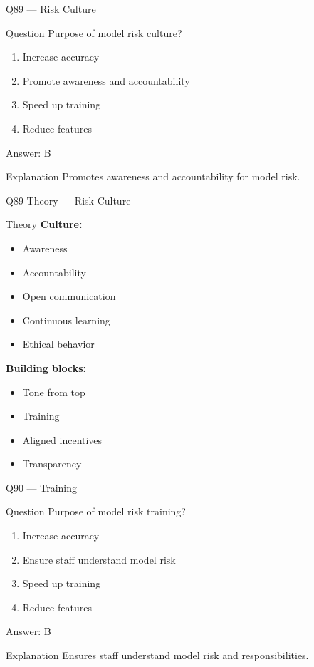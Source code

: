 \documentclass[aspectratio=169,8pt]{beamer}
\begin{document}
	\begin{frame}{Q89 --- Risk Culture}
		\begin{block}{Question}
			Purpose of model risk culture?
		\end{block}
		\begin{enumerate}[label=\Alph*.]
			\item Increase accuracy
			\item Promote awareness and accountability
			\item Speed up training
			\item Reduce features
		\end{enumerate}
		\begin{exampleblock}{Answer: B}
		\end{exampleblock}
		\begin{block}{Explanation}
			Promotes awareness and accountability for model risk.
		\end{block}
	\end{frame}
	
	\begin{frame}{Q89 Theory --- Risk Culture}
		\begin{block}{Theory}
			\textbf{Culture:}
			\begin{itemize}
				\item Awareness
				\item Accountability
				\item Open communication
				\item Continuous learning
				\item Ethical behavior
			\end{itemize}
			\textbf{Building blocks:}
			\begin{itemize}
				\item Tone from top
				\item Training
				\item Aligned incentives
				\item Transparency
			\end{itemize}
		\end{block}
	\end{frame}
	
	\begin{frame}{Q90 --- Training}
		\begin{block}{Question}
			Purpose of model risk training?
		\end{block}
		\begin{enumerate}[label=\Alph*.]
			\item Increase accuracy
			\item Ensure staff understand model risk
			\item Speed up training
			\item Reduce features
		\end{enumerate}
		\begin{exampleblock}{Answer: B}
		\end{exampleblock}
		\begin{block}{Explanation}
			Ensures staff understand model risk and responsibilities.
		\end{block}
	\end{frame}
	
\end{document}
